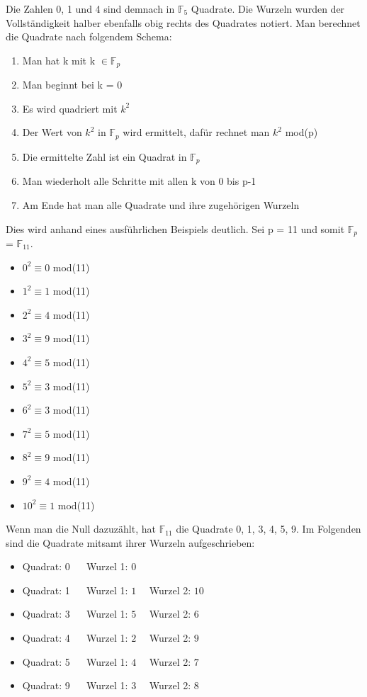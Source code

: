Die Zahlen 0, 1 und 4 sind demnach in $\mathbb{F}_{5}$ Quadrate. Die Wurzeln wurden der Vollständigkeit halber ebenfalls obig rechts des Quadrates notiert. Man berechnet die Quadrate nach folgendem Schema:

\begin{enumerate}
\item Man hat k mit k $\in \mathbb{F}_{p}$
\item Man beginnt bei k = 0
\item Es wird quadriert mit $k^{2}$
\item Der Wert von $k^{2}$ in $\mathbb{F}_{p}$ wird ermittelt, dafür rechnet man $k^{2}$ mod(p)
\item Die ermittelte Zahl ist ein Quadrat in $\mathbb{F}_{p}$
\item Man wiederholt alle Schritte mit allen k von 0 bis p-1
\item Am Ende hat man alle Quadrate und ihre zugehörigen Wurzeln
\end{enumerate}

Dies wird anhand eines ausführlichen Beispiels deutlich. Sei p = 11 und somit $\mathbb{F}_{p}$ = $\mathbb{F}_{11}$. 

\begin{itemize}
\item $0^{2} \equiv 0 $  mod(11)
\item $1^{2} \equiv 1 $  mod(11)
\item $2^{2} \equiv 4 $  mod(11)
\item $3^{2} \equiv 9 $  mod(11)
\item $4^{2} \equiv 5 $  mod(11)
\item $5^{2} \equiv 3 $  mod(11)
\item $6^{2} \equiv 3 $  mod(11)
\item $7^{2} \equiv 5 $  mod(11)
\item $8^{2} \equiv 9 $  mod(11)
\item $9^{2} \equiv 4 $  mod(11)
\item $10^{2} \equiv 1 $  mod(11)
\end{itemize}

Wenn man die Null dazuzählt, hat $\mathbb{F}_{11}$ die Quadrate 0, 1, 3, 4, 5, 9. Im Folgenden sind die Quadrate mitsamt ihrer Wurzeln aufgeschrieben:

\begin{itemize}
\item Quadrat: 0 $\quad$ Wurzel 1: $0$
\item Quadrat: 1 $\quad$ Wurzel 1: $1 \quad$ Wurzel 2: $10$
\item Quadrat: 3 $\quad$ Wurzel 1: $5 \quad$ Wurzel 2: $6$
\item Quadrat: 4 $\quad$ Wurzel 1: $2 \quad$ Wurzel 2: $9$
\item Quadrat: 5 $\quad$ Wurzel 1: $4 \quad$ Wurzel 2: $7$
\item Quadrat: 9 $\quad$ Wurzel 1: $3 \quad$ Wurzel 2: $8$
\end{itemize}

